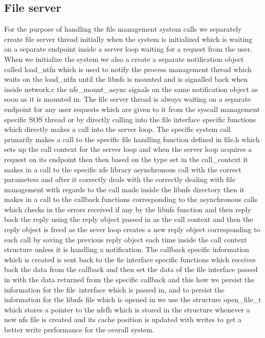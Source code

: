\subsection{File server}

For the purpose of handling the file management system calls we separately create file server thread initially when the system is 
initialized which is waiting on a separate endpoint inside a server loop waiting for a request from the user. When we initialize the system we also a create a separate notification object 
called load\_ntfn which is used to notify the process management thread which waits on the load\_ntfn until the libnfs is mounted and is signalled back when inside network.c  the nfs\_mount\_async signals on the same notification object as soon as it is mounted in. The file server thread is always waiting on a separate endpoint for any user requests which are given to it from the syscall management specific 
SOS thread or by directly calling into the file interface specific functions which directly makes a call into the server loop. The specific system call primarily makes a call to the specific file handling function defined in file.h which sets up the call context for the server loop and when the server loop acquires a request on its endpoint then
then based on the type set in the call\_context it makes in a call to the specific nfs library asynchronous call with the correct parameters and after it correctly deals with the correctly dealing with file management with regards to the call made inside the libnfs directory then it makes in a call to the callback functions corresponding to the asynchronous calls which checks in the errors received if any by the libnfs function 
and then reply back the reply using the reply object passed in as the call context and then the reply object is freed as the sever loop creates a new reply object corresponding to each call by saving the previous reply object each time inside the call context structure unless it is handling a notification.
The callback specific information which is created is sent back to the fie interface specific functions which receives back the data from the callback and then set the data of the file interface passed in with the data returned from the specific callback and this how we 
persist the information for the file\ interface which is passed in, and to persist the information for the libnfs file which is opened in we use the structure open\_file\_t which stores a pointer to the nfsfh which is stored in the structure whenever a new nfs file is created and its cache position is updated with writes to get a better write performance for the overall system.








